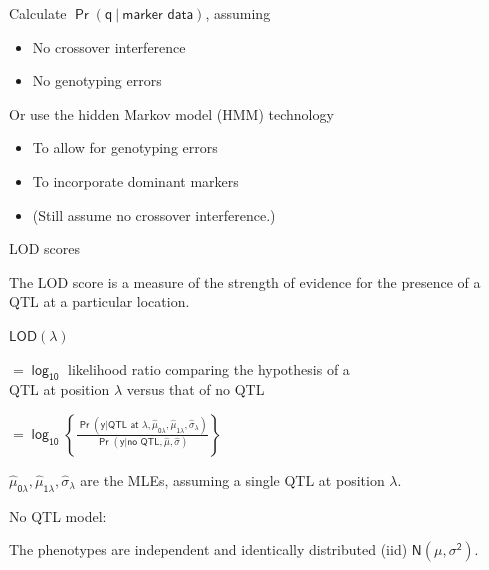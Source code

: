 \documentclass[12pt]{article}
\newcommand{\headsize}{\fontsize{35}{35} \selectfont}
\newcommand{\smallersize}{\fontsize{20}{25} \selectfont}
\newcommand{\lod}{\text{LOD}}
\begin{document}
\vspace{15mm}

\hfill
\begin{minipage}{10in}
\color{mywhite} \smallersize
Calculate {\color{myblue} $\mathsf{\Pr(q \ | \ \text{marker data})}$}, assuming
\begin{itemize}
\item No crossover interference
\item No genotyping errors
\end{itemize}

\vspace{10mm}

Or use the {\color{mypink} hidden Markov model (HMM)} technology
\begin{itemize}
\item To allow for genotyping errors
\item To incorporate dominant markers
\item {\color{myblue} (Still assume no crossover interference.)}
\end{itemize}
\end{minipage}





\newpage

\headsize \color{myyellow}
\hfill \begin{minipage}{5.75in}
\centering
LOD scores
\end{minipage}

\vspace{25mm}

\hfill
\begin{minipage}{10in}
\color{mywhite} \smallersize
 The LOD score is a measure of the {\color{mypink} strength of
evidence} for the presence of a QTL at a particular
location.
\vspace{15mm}

 $\mathsf{\lod(\lambda)}$
\begin{minipage}[t]{8.5in}
$\mathsf{= \log_{10}}$ likelihood ratio comparing the hypothesis of a \\
\hspace*{8mm} QTL at position $\mathsf{\lambda}$ versus that of no QTL
\vspace{5mm}

\headsize
$\mathsf{= \log_{10} \left\{ \frac{\Pr(y | \text{QTL at $\lambda$}, \hat{\mu}_{0\lambda},
\hat{\mu}_{1\lambda}, \hat{\sigma}_\lambda)}{\Pr(y | \text{no QTL}, \hat{\mu},
\hat{\sigma})} \right\}}$
\end{minipage}
\vspace{15mm}

 $\mathsf{\hat{\mu}_{0\lambda}, \hat{\mu}_{1\lambda}, \hat{\sigma}_\lambda}$ are the MLEs,
assuming a single QTL at position $\mathsf{\lambda}$.
\vspace{15mm}

 No QTL model:
\begin{minipage}[t]{7.5in}
The phenotypes are independent and identically
distributed (iid) $\mathsf{N(\mu, \sigma^2)}$.
\end{minipage}
\end{minipage}
\end{document}
